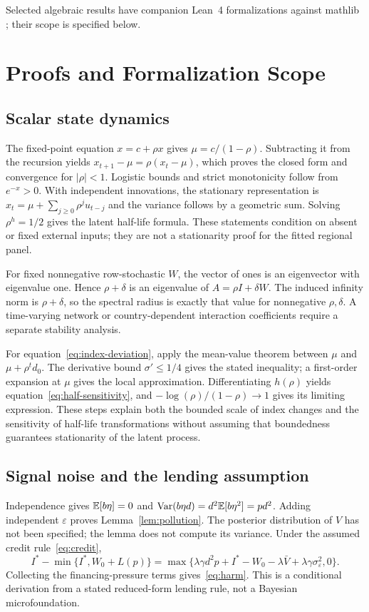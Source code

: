 Selected algebraic results have companion Lean~4 formalizations against mathlib
\citep{moura2021lean,mathlib2020lean}; their scope is specified below.

\section{Proofs and Formalization Scope}\label{app:proofs}

\subsection{Scalar state dynamics}
The fixed-point equation $x=c+\rho x$ gives $\mu=c/(1-\rho)$.
Subtracting it from the recursion yields $x_{t+1}-\mu=\rho(x_t-\mu)$,
which proves the closed form and convergence for $|\rho|<1$.
Logistic bounds and strict monotonicity follow from $e^{-x}>0$.
With independent innovations, the stationary representation is
$x_t=\mu+\sum_{j\ge0}\rho^ju_{t-j}$ and the variance follows by a geometric
sum. Solving $\rho^h=1/2$ gives the latent half-life formula. These statements
condition on absent or fixed external inputs; they are not a stationarity
proof for the fitted regional panel.

For fixed nonnegative row-stochastic $W$, the vector of ones is an eigenvector
with eigenvalue one. Hence $\rho+\delta$ is an eigenvalue of
$A=\rho I+\delta W$. The induced infinity norm is $\rho+\delta$, so the
spectral radius is exactly that value for nonnegative $\rho,\delta$.
A time-varying network or country-dependent interaction coefficients require
a separate stability analysis.

For equation~\eqref{eq:index-deviation}, apply the mean-value theorem between
$\mu$ and $\mu+\rho^td_0$. The derivative bound $\sigma'\le1/4$ gives
the stated inequality; a first-order expansion at $\mu$ gives the local
approximation. Differentiating $h(\rho)$ yields
equation~\eqref{eq:half-sensitivity}, and
$-\log(\rho)/(1-\rho)\to1$ gives its limiting expression. These steps
explain both the bounded scale of index changes and the sensitivity of
half-life transformations without assuming that boundedness guarantees
stationarity of the latent process.

\subsection{Signal noise and the lending assumption}
Independence gives $\mathbb{E}[b\eta]=0$ and
$\mathrm{Var}(b\eta d)=d^2\mathbb{E}[b\eta^2]=pd^2$. Adding independent
$\varepsilon$ proves Lemma~\ref{lem:pollution}. The posterior distribution
of $V$ has not been specified; the lemma does not compute its variance.
Under the assumed credit rule~\eqref{eq:credit},
\[
 I^*-\min\{I^*,W_0+L(p)\}
 =\max\{\lambda\gamma d^2p+I^*-W_0-\lambda\bar V
                   +\lambda\gamma\sigma_\varepsilon^2,0\}.
\]
Collecting the financing-pressure terms gives~\eqref{eq:harm}. This is a
conditional derivation from a stated reduced-form lending rule, not a
Bayesian microfoundation.

